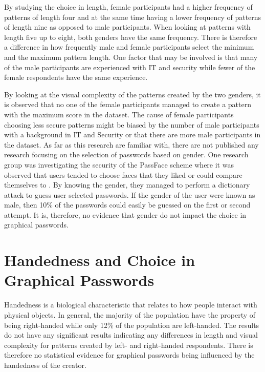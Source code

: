     By studying the choice in length, female participants had a higher frequency of patterns of length four and at the same time having a lower frequency of patterns of length nine as opposed to male participants. When looking at patterns with length five up to eight, both genders have the same frequency. There is therefore a difference in how frequently male and female participants select the minimum and the maximum pattern length. One factor that may be involved is that many of the male participants are experienced with IT and security while fewer of the female respondents have the same experience. 

    By looking at the visual complexity of the patterns created by the two genders, it is observed that no one of the female participants managed to create a pattern with the maximum score in the dataset.  The cause of female participants choosing less secure patterns might be biased by the number of male participants with a background in IT and Security or that there are more male participants in the dataset.  As far as this research are familiar with, there are not published any research focusing on the selection of passwords based on gender. One research group was investigating the security of the PassFace scheme where it was observed that users tended to choose faces that they liked or could compare themselves to \cite{Davis}. By knowing the gender, they managed to perform a dictionary attack to guess user selected passwords. If the gender of the user were known as male, then 10\% of the passwords could easily be guessed on the first or second attempt. It is, therefore, no evidence that gender do not impact the choice in graphical passwords. 
    
  \section{Handedness and Choice in Graphical Passwords}
    
    Handedness is a biological characteristic that relates to how people interact with physical objects. In general, the majority of the population have the property of being right-handed while only 12\% of the population are left-handed. The results do not have any significant results indicating any differences in length and visual complexity for patterns created by left- and right-handed respondents. There is therefore no statistical evidence for graphical passwords being influenced by the handedness of the creator.

